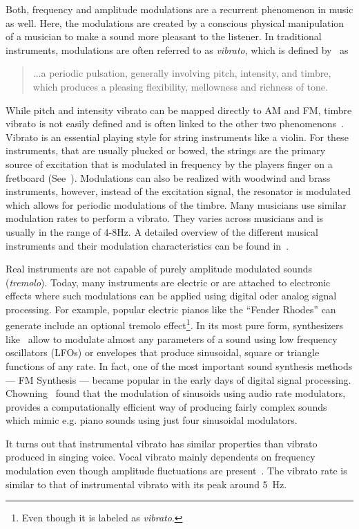 Both, frequency and amplitude modulations are a recurrent phenomenon in music as well.
Here, the modulations are created by a conscious physical manipulation of a musician to make a sound more pleasant to the listener.
In traditional instruments, modulations are often referred to as \emph{vibrato}, which is defined by~\cite{seashore31} as

\begin{quote}
...a periodic pulsation, generally involving pitch, intensity, and timbre, which produces a pleasing flexibility, mellowness and richness of tone.
\end{quote}

While pitch and intensity vibrato can be mapped directly to AM and FM, timbre vibrato is not easily defined and is often linked to the other two phenomenons~\cite{desain99}.
Vibrato is an essential playing style for string instruments like a violin. 
For these instruments, that are usually plucked or bowed, the strings are the primary source of excitation that is modulated in frequency by the players finger on a fretboard (See~\cite{macleod06}).
Modulations can also be realized with woodwind and brass instruments, however, instead of the excitation signal, the resonator is modulated which allows for periodic modulations of the timbre.
Many musicians use similar modulation rates to perform a vibrato.
They varies across musicians and is usually in the range of 4-8\si{\hertz}.
A detailed overview of the different musical instruments and their modulation characteristics can be found in~\cite{fletcher01}.
\par
Real instruments are not capable of purely amplitude modulated sounds (\emph{tremolo}). 
Today, many instruments are electric or are attached to electronic effects where such modulations can be applied using digital oder analog signal processing.
For example, popular electric pianos like the ``Fender Rhodes'' can generate include an optional tremolo effect\footnote{Even though it is labeled as \emph{vibrato}.}.
In its most pure form, synthesizers like~\cite{pinch09, buchla05} allow to modulate almost any parameters of a sound using low frequency oscillators (LFOs) or envelopes that produce sinusoidal, square or triangle functions of any rate.
In fact, one of the most important sound synthesis methods --- FM Synthesis --- became popular in the early days of digital signal processing. 
Chowning~\cite{chowning73} found that the modulation of sinusoids using audio rate modulators, provides a computationally efficient way of producing fairly complex sounds which mimic e.g. piano sounds using just four sinusoidal modulators.
\par
It turns out that instrumental vibrato has similar properties than vibrato produced in singing voice.
Vocal vibrato mainly dependents on frequency modulation even though amplitude fluctuations are present~\cite{sundberg94}. 
The vibrato rate is similar to that of instrumental vibrato with its peak around 5~\si{\hertz}.

